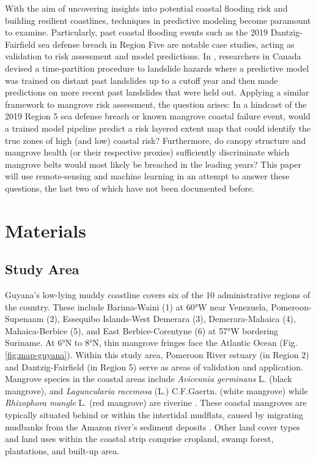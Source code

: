 \documentclass[final-report]{report-template}
\begin{document}
With the aim of uncovering insights into potential coastal flooding risk and building resilient coastlines, techniques in predictive modeling become paramount to examine. Particularly,  past coastal flooding events such as the 2019 Dantzig-Fairfield sea defense breach in Region Five are notable case studies, acting as validation to risk assessment and model predictions. In \textcite{Chung2003}, researchers in Canada devised a time-partition procedure to landslide hazards where a predictive model was trained on distant past landslides up to a cutoff year and then made predictions on more recent past landslides that were held out. Applying a similar framework to mangrove risk assessment, the question arises: In a hindcast of the 2019 Region 5 sea defense breach or known mangrove coastal failure event, would a trained model pipeline predict a risk layered extent map that could identify the true zones of high (and low) coastal risk? Furthermore, do canopy structure and mangrove health (or their respective proxies) sufficiently discriminate which mangrove belts would most likely be breached in the leading years? This paper will use remote-sensing and machine learning in an attempt to answer these questions, the last two of which have not been documented before.  

\section{Materials}

\subsection{Study Area}
Guyana's low-lying muddy coastline covers six of the 10 administrative regions of the country. These include Barima-Waini (1) at \ang{60}W near Venezuela, Pomeroon-Supenaam (2), Essequibo Islands-West Demerara (3), Demerara-Mahaica (4), Mahaica-Berbice (5), and East Berbice-Corentyne (6) at \ang{57}W bordering Suriname. At  \ang{6}N to \ang{8}N, thin mangrove fringes face the Atlantic Ocean (Fig.\ref{fig:map-guyana}). Within this study area, Pomeroon River estuary (in Region 2)  and Dantzig-Fairfield (in Region 5) serve as areas of validation and application. Mangrove species in the coastal areas include \textit{Avicennia germinans} L. (black mangrove), and \textit{Laguncularia racemosa} (L.) C.F.Gaertn. (white mangrove) while \textit{Rhizophora mangle} L. (red mangrove) are riverine \parencite{Dookie2025}. These coastal mangroves are typically situated behind or within the intertidal mudflats, caused by migrating mudbanks from the Amazon river's sediment deposits \parencite{Oyedotun2019}. Other land cover types and land uses within the coastal strip comprise cropland, swamp forest, plantations, and built-up area. 
\end{document}
